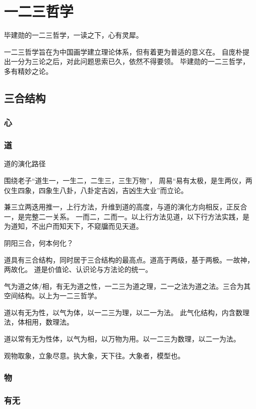 \chapter{一二三哲学}

毕建勋的一二三哲学，一读之下，心有灵犀。

一二三哲学旨在为中国画学建立理论体系，但有着更为普适的意义在。
自庞朴提出一分为三论之后，对此问题思索已久，依然不得要领。
毕建勋的一二三哲学，多有精妙之论。

\section{三合结构}

\subsection{心}

\subsection{道}

道的演化路径

围绕老子“道生一，一生二，二生三，三生万物”，
周易“易有太极，是生两仪，两仪生四象，四象生八卦，八卦定吉凶，吉凶生大业”而立论。

兼三立两迭用推一，上行方法，升维到道的高度，与道的演化方向相反，正反合一，是完整二一关系。
一而二，二而一。以上行方法见道，以下行方法实践，是为道知，不出户而知天下，不窥牖而见天道。

阴阳三合，何本何化？

道具有三合结构，同时居于三合结构的最高点。道高于两级，基于两极。一故神，两故化。
道是价值论、认识论与方法论的统一。

气为道之体/相，有无为道之性，一二三为道之理，二一之法为道之法。三合为其空间结构。以上为一二三哲学。

道以有无为性，以气为体，以一二三为理，以二一为法。
此气化结构，内含数理法，体相用，数理法。

道以常有无为性体，以气为相，以万物为用。以一二三为数理，以二一为法。

观物取象，立象尽意。执大象，天下往。大象者，模型也。

\subsection{物}

\subsection{有无}

